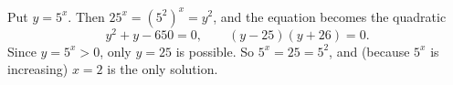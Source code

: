 Put $y=5^x$. Then $25^x=\left(5^2\right)^x=y^2$, and the equation becomes the quadratic
\[
y^2+y-650=0,\qquad (y-25)(y+26)=0 .
\]
Since $y=5^x>0$, only $y=25$ is possible. So $5^x=25=5^2$, and (because $5^x$ is increasing) $\boxed{x=2}$ is the only solution.
